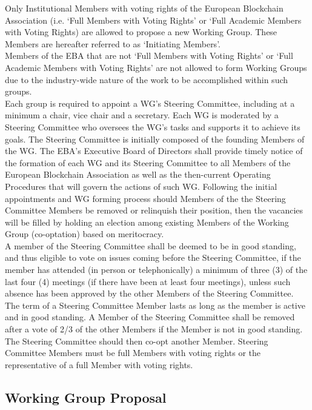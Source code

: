 \documentclass{article}
\begin{document}
Only Institutional Members with voting rights of the European Blockchain Association (i.e. ‘Full Members with Voting Rights’ or ‘Full Academic Members with Voting Rights) are allowed to propose a new Working Group. These Members are hereafter referred to as ‘Initiating Members’. \\
Members of the EBA that are not ‘Full Members with Voting Rights’ or ‘Full Academic Members with Voting Rights’ are not allowed to form Working Groups due to the industry-wide nature of the work to be accomplished within such groups. \\ 
Each group is required to appoint a WG’s Steering Committee, including at a minimum a chair, vice chair and a secretary.
 Each WG is moderated by a Steering Committee who oversees the WG’s tasks and supports it to achieve its goals. 
 The Steering Committee is initially composed of the founding Members of the WG. 
 The EBA’s Executive Board of Directors shall provide timely notice of the formation of each WG and its Steering Committee to all Members of the European Blockchain Association as well as the then-current Operating Procedures that will govern the actions of such WG. 
 Following the initial appointments and WG forming process should Members of the the Steering Committee Members be removed or relinquish their position, then the vacancies will be filled by holding an election among existing Members of the Working Group (co-optation) based on meritocracy. \\
A member of the Steering Committee shall be deemed to be in good standing, and thus eligible to vote on issues coming before the Steering Committee, if the member has attended (in person or telephonically) a minimum of three (3) of the last four (4) meetings (if there have been at least four meetings), unless such absence has been approved by the other Members of the Steering Committee. The term of a Steering Committee Member lasts as long as the member is active and in good standing. 
A Member of the Steering Committee shall be removed after a vote of 2/3 of the other Members if the Member is not in good standing. The Steering Committee should then co-opt another Member. 
Steering Committee Members must be full Members with voting rights or the representative of a full Member with voting rights.

\subsection{Working Group Proposal}
\end{document}
